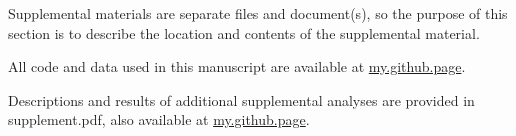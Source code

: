 \documentclass[12pt]{article}
\begin{document}
Supplemental materials are separate files and document(s), so the purpose of 
this section is to describe the location and contents of the supplemental 
material.  

All code and data used in this manuscript are available at \url{my.github.page}.

Descriptions and results of additional supplemental analyses are provided in 
supplement.pdf, also available at \url{my.github.page}.








\end{document}
